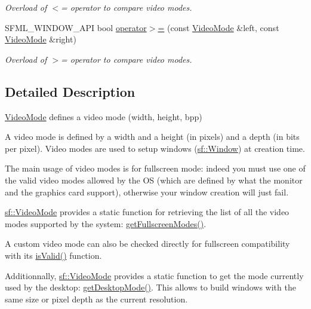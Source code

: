 \begin{DoxyCompactItemize}
\begin{DoxyCompactList}\small\item\em Overload of $<$= operator to compare video modes. \end{DoxyCompactList}\item 
S\+F\+M\+L\+\_\+\+W\+I\+N\+D\+O\+W\+\_\+\+A\+P\+I bool \hyperlink{classsf_1_1_video_mode_a7f7983e336203d34c9878c77fff60f1f}{operator$>$=} (const \hyperlink{classsf_1_1_video_mode}{Video\+Mode} \&left, const \hyperlink{classsf_1_1_video_mode}{Video\+Mode} \&right)
\begin{DoxyCompactList}\small\item\em Overload of $>$= operator to compare video modes. \end{DoxyCompactList}\end{DoxyCompactItemize}


\subsection{Detailed Description}
\hyperlink{classsf_1_1_video_mode}{Video\+Mode} defines a video mode (width, height, bpp) 

A video mode is defined by a width and a height (in pixels) and a depth (in bits per pixel). Video modes are used to setup windows (\hyperlink{classsf_1_1_window}{sf\+::\+Window}) at creation time.

The main usage of video modes is for fullscreen mode\+: indeed you must use one of the valid video modes allowed by the O\+S (which are defined by what the monitor and the graphics card support), otherwise your window creation will just fail.

\hyperlink{classsf_1_1_video_mode}{sf\+::\+Video\+Mode} provides a static function for retrieving the list of all the video modes supported by the system\+: \hyperlink{classsf_1_1_video_mode_a6815b9b3b35767d5b4563fbed4bfc67b}{get\+Fullscreen\+Modes()}.

A custom video mode can also be checked directly for fullscreen compatibility with its \hyperlink{classsf_1_1_video_mode_aa64ff5420dde3b31c24b9c4e2be9cd9c}{is\+Valid()} function.

Additionnally, \hyperlink{classsf_1_1_video_mode}{sf\+::\+Video\+Mode} provides a static function to get the mode currently used by the desktop\+: \hyperlink{classsf_1_1_video_mode_ac1be160a4342e6eafb2cb0e8c9b18d44}{get\+Desktop\+Mode()}. This allows to build windows with the same size or pixel depth as the current resolution.

